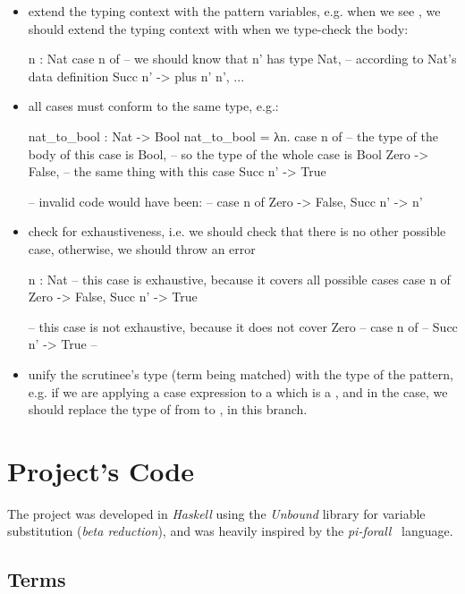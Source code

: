 \begin{itemize}
       \item extend the typing context with the pattern variables, e.g. when we see , we should extend the typing context with  when we type-check the body:
\begin{piforall}
n : Nat
case n of {
  -- we should know that n' has type Nat,
  --  according to Nat's data definition
  Succ n' -> plus n' n',
  ...
}
\end{piforall}
       \item all cases must conform to the same type, e.g.:
\begin{piforall}
nat_to_bool : Nat -> Bool
nat_to_bool = λn. case n of {
  -- the type of the body of this case is Bool,
  -- so the type of the whole case is Bool
  Zero -> False,
  -- the same thing with this case
  Succ n' -> True
}

-- invalid code would have been:
-- case n of { Zero -> False, Succ n' -> n' }
\end{piforall}
       \item check for exhaustiveness, i.e. we should check that there is no other possible case, otherwise, we should throw an error
\begin{piforall}
n : Nat
-- this case is exhaustive, because it covers all possible cases
case n of {
  Zero -> False,
  Succ n' -> True
}

-- this case is not exhaustive, because it does not cover Zero
--   case n of {
--     Succ n' -> True
--   }
\end{piforall}
       \item unify the scrutinee's type (term being matched) with the type of the pattern, e.g. if we are applying a case expression to a  which is a , and in the  case, we should replace the type of  from  to , in this branch.
\end{itemize}



\section{Project's Code}

The project was developed in \emph{Haskell} using the \emph{Unbound} library for variable substitution (\emph{beta reduction}), and was heavily inspired by the \emph{pi-forall}~\cite{oplss} language.
\subsection{Terms}

